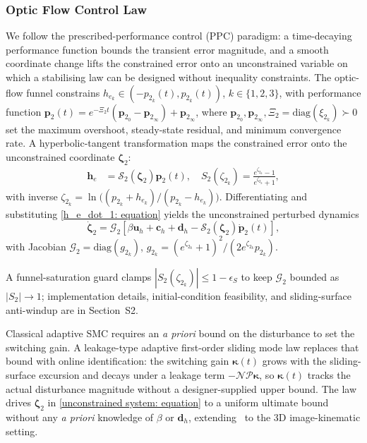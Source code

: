 \subsubsection{Optic Flow Control Law} \label{ppc optic flow: section}
We follow the prescribed-performance control (PPC) paradigm: a time-decaying performance function bounds the transient error magnitude, and a smooth coordinate change lifts the constrained error onto an unconstrained variable on which a stabilising law can be designed without inequality constraints. The optic-flow funnel constrains $h_{e_k}\in(-p_{2_k}(t),p_{2_k}(t))$, $k\in\{1,2,3\}$, with performance function $\boldsymbol{p}_2(t) = e^{-\Xi_2 t}(\boldsymbol{p}_{2_0}-\boldsymbol{p}_{2_\infty})+\boldsymbol{p}_{2_\infty}$, where $\boldsymbol{p}_{2_0},\boldsymbol{p}_{2_\infty},\Xi_2=\text{diag}(\xi_{2_k})\succ 0$ set the maximum overshoot, steady-state residual, and minimum convergence rate. A hyperbolic-tangent transformation maps the constrained error onto the unconstrained coordinate $\boldsymbol{\zeta}_2$:
\begin{align}
    \label{optical flow error transformation: equation}
    \boldsymbol{h}_e &= \mathcal{S}_2(\boldsymbol{\zeta}_2)\boldsymbol{p}_2(t),\quad S_2(\zeta_{2_k}) = \frac{e^{\zeta_{2_k}}-1}{e^{\zeta_{2_k}}+1},
\end{align}
with inverse $\zeta_{2_k}=\ln\!\big((p_{2_k}+h_{e_k})/(p_{2_k}-h_{e_k})\big)$. Differentiating and substituting \eqref{h_e_dot_1: equation} yields the unconstrained perturbed dynamics
\begin{equation} \label{unconstrained system: equation}
    \dot{\boldsymbol{\zeta}}_2 = \mathcal{G}_2\!\left[\beta\boldsymbol{u}_h + \boldsymbol{c}_h + \boldsymbol{d}_h - \mathcal{S}_2(\boldsymbol{\zeta}_2)\dot{\boldsymbol{p}}_2(t)\right],
\end{equation}
with Jacobian $\mathcal{G}_2=\text{diag}(g_{2_k})$, $g_{2_k}=(e^{\zeta_{2_k}}+1)^2/(2e^{\zeta_{2_k}}p_{2_k})$.

A funnel-saturation guard clamps $|S_2(\zeta_{2_k})|\le 1-\epsilon_S$ to keep $\mathcal{G}_2$ bounded as $|S_2|\to 1$; implementation details, initial-condition feasibility, and sliding-surface anti-windup are in Section~S2.

Classical adaptive SMC requires an \emph{a priori} bound on the disturbance to set the switching gain. A leakage-type adaptive first-order sliding mode law replaces that bound with online identification: the switching gain $\boldsymbol{\kappa}(t)$ grows with the sliding-surface excursion and decays under a leakage term $-\mathcal{N}\mathcal{P}\boldsymbol{\kappa}$, so $\boldsymbol{\kappa}(t)$ tracks the actual disturbance magnitude without a designer-supplied upper bound. The law drives $\boldsymbol{\zeta}_2$ in \eqref{unconstrained system: equation} to a uniform ultimate bound without any \emph{a priori} knowledge of $\beta$ or $\boldsymbol{d}_h$, extending~\cite{singhal2025} to the 3D image-kinematic setting.

